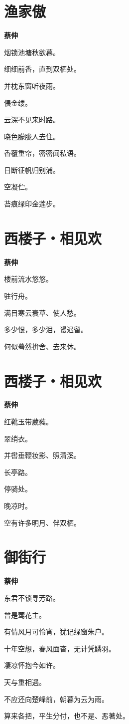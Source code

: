 \documentclass[12pt,a4paper]{ctexbook}
\begin{document}
\section{渔家傲}
\textbf{蔡伸}\par\vspace{0.5em}
烟锁池塘秋欲暮。\par
细细前香，直到双栖处。\par
并枕东窗听夜雨。\par
偎金缕。\par
云深不见来时路。\par
晓色朦胧人去住。\par
香覆重帘，密密闻私语。\par
日断征帆归别浦。\par
空凝伫。\par
苔痕绿印金莲步。\par

\section{西楼子・相见欢}
\textbf{蔡伸}\par\vspace{0.5em}
楼前流水悠悠。\par
驻行舟。\par
满目寒云衰草、使人愁。\par
多少恨，多少泪，谩迟留。\par
何似蓦然拚舍、去来休。\par

\section{西楼子・相见欢}
\textbf{蔡伸}\par\vspace{0.5em}
红靴玉带葳蕤。\par
翠绡衣。\par
并辔垂鞭妆影、照清溪。\par
长亭路。\par
停骑处。\par
晚凉时。\par
空有许多明月、伴双栖。\par

\section{御街行}
\textbf{蔡伸}\par\vspace{0.5em}
东君不锁寻芳路。\par
曾是莺花主。\par
有情风月可怜宵，犹记绿窗朱户。\par
十年空想，春风面杳，无计凭鳞羽。\par
凄凉怀抱今如许。\par
天与重相遇。\par
不应还向楚峰前，朝暮为云为雨。\par
算来各把，平生分付，也不是、恶著处。\par
\end{document}
